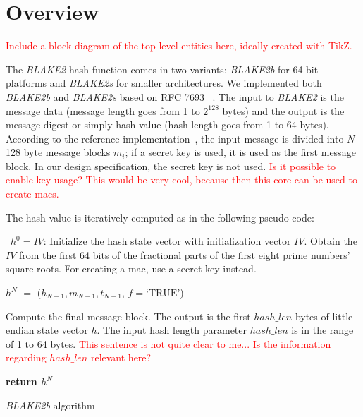 \documentclass[%
	a4paper,
]
{article}
\newcommand{\todo}[1]{\textcolor{red}{#1}}
\begin{document}
\section{Overview}
\label{sec:overview}

\todo{Include a block diagram of the top-level entities here, ideally
created with TikZ.}

The \emph{BLAKE2} hash function comes in two variants: \emph{BLAKE2b} for
64-bit platforms and \emph{BLAKE2s} for smaller architectures.
%
We implemented both \emph{BLAKE2b} and \emph{BLAKE2s} based on RFC 7693~%
\autocite{rfc7693}.	
%
The input to \emph{BLAKE2} is the message data (message
length goes from 1 to $2^{128}$ bytes) and the output is the message digest or
simply hash value (hash length goes from 1 to 64 bytes).
%
According to the reference implementation~\autocite{REF}, the input message is
divided into $N$ 128 byte message blocks $m_i$; if a secret key is used, it is
used as the first message block. In our design specification, the secret key is
not used. \todo{Is it possible to enable key usage? This would be very cool,
because then this core can be used to create \glspl{mac}.}

The hash value is iteratively computed as in the following pseudo-code:

\begin{algorithm}
\justifying

	\ $h^{0}=IV$: Initialize the hash state vector with initialization
		vector $IV$. Obtain the $IV$ from the first 64 bits of the fractional
		parts of the first eight prime numbers' square roots. For creating
		a \gls{mac}, use a secret key instead.

	\BlankLine
	

	\BlankLine
	

	$h^{N}$ $=$ ($h_{N-1}, m_{N-1},t_{N-1}$, $f=\textrm{`TRUE'} $) \

		Compute the final message block. The output is the first $hash\_len$
		bytes of little-endian state vector $h$. The input hash length parameter
		$hash\_len$ is in the range of 1 to 64 bytes.
		\todo{This sentence is not quite clear to me... Is the information
		regarding $hash\_len$ relevant here?}

	\BlankLine

	\textbf{return $h^{N}$}
	
	\caption{\emph{BLAKE2b} algorithm}
	\label{alg:bbs}
	
\end{algorithm}
\end{document}
